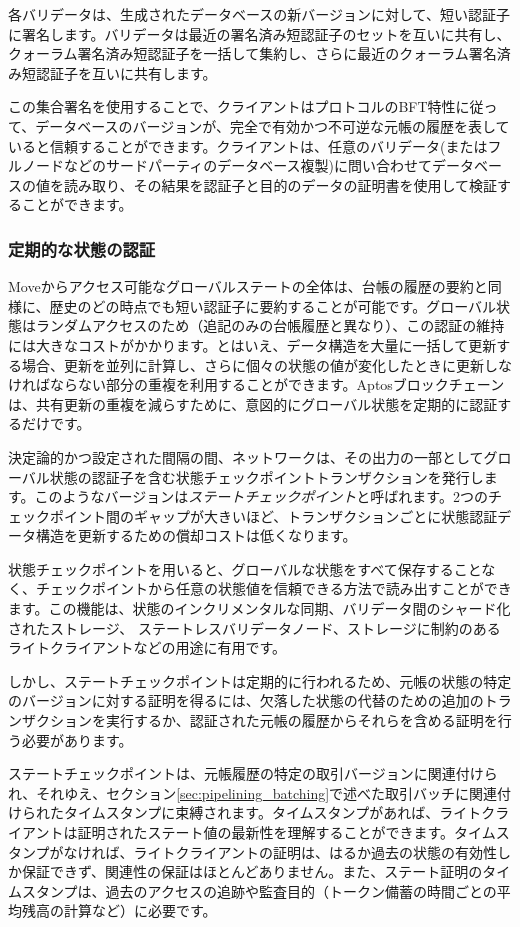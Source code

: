 \documentclass{article}
\begin{document}
各バリデータは、生成されたデータベースの新バージョンに対して、短い認証子に署名します。バリデータは最近の署名済み短認証子のセットを互いに共有し、クォーラム署名済み短認証子を一括して集約し、さらに最近のクォーラム署名済み短認証子を互いに共有します。

この集合署名を使用することで、クライアントはプロトコルのBFT特性に従って、データベースのバージョンが、完全で有効かつ不可逆な元帳の履歴を表していると信頼することができます。クライアントは、任意のバリデータ(またはフルノードなどのサードパーティのデータベース複製)に問い合わせてデータベースの値を読み取り、その結果を認証子と目的のデータの証明書を使用して検証することができます。

\subsubsection{定期的な状態の認証}
\label{subsubsec:period_state_certification}

Moveからアクセス可能なグローバルステートの全体は、台帳の履歴の要約と同様に、歴史のどの時点でも短い認証子に要約することが可能です。グローバル状態はランダムアクセスのため（追記のみの台帳履歴と異なり）、この認証の維持には大きなコストがかかります。とはいえ、データ構造を大量に一括して更新する場合、更新を並列に計算し、さらに個々の状態の値が変化したときに更新しなければならない部分の重複を利用することができます。Aptosブロックチェーンは、共有更新の重複を減らすために、意図的にグローバル状態を定期的に認証するだけです。

決定論的かつ設定された間隔の間、ネットワークは、その出力の一部としてグローバル状態の認証子を含む状態チェックポイントトランザクションを発行します。このようなバージョンは\emph{ステートチェックポイント}と呼ばれます。2つのチェックポイント間のギャップが大きいほど、トランザクションごとに状態認証データ構造を更新するための償却コストは低くなります。

状態チェックポイントを用いると、グローバルな状態をすべて保存することなく、チェックポイントから任意の状態値を信頼できる方法で読み出すことができます。この機能は、状態のインクリメンタルな同期、バリデータ間のシャード化されたストレージ、 ステートレスバリデータノード、ストレージに制約のあるライトクライアントなどの用途に有用です。

しかし、ステートチェックポイントは定期的に行われるため、元帳の状態の特定のバージョンに対する証明を得るには、欠落した状態の代替のための追加のトランザクションを実行するか、認証された元帳の履歴からそれらを含める証明を行う必要があります。

ステートチェックポイントは、元帳履歴の特定の取引バージョンに関連付けられ、それゆえ、セクション\ref{sec:pipelining_batching}で述べた取引バッチに関連付けられたタイムスタンプに束縛されます。タイムスタンプがあれば、ライトクライアントは証明されたステート値の最新性を理解することができます。タイムスタンプがなければ、ライトクライアントの証明は、はるか過去の状態の有効性しか保証できず、関連性の保証はほとんどありません。また、ステート証明のタイムスタンプは、過去のアクセスの追跡や監査目的（トークン備蓄の時間ごとの平均残高の計算など）に必要です。
\end{document}
